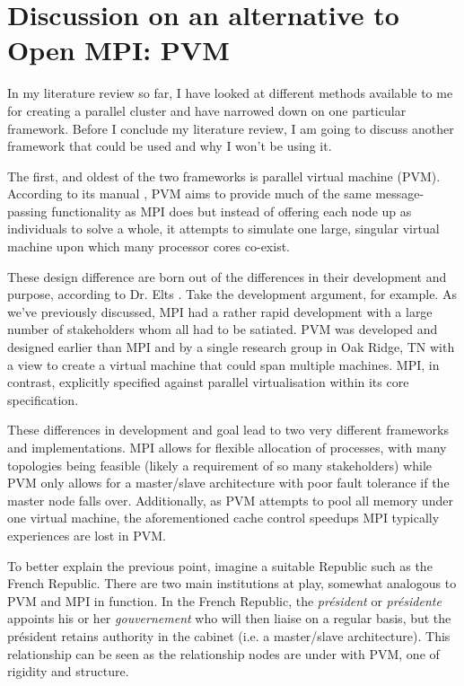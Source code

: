 \section{Discussion on an alternative to Open MPI: PVM}
In my literature review so far, I have looked at different methods available to me for creating a parallel cluster and have narrowed down on one particular framework. Before I conclude my literature review, I am going to discuss another framework that could be used and why I won't be using it.

The first, and oldest of the two frameworks is parallel virtual machine (PVM). According to its manual \cite{geist_et_al_1995}, PVM aims to provide much of the same message-passing functionality as MPI does but instead of offering each node up as individuals to solve a whole, it attempts to simulate one large, singular virtual machine upon which many processor cores co-exist.

These design difference are born out of the differences in their development and purpose, according to Dr. Elts \cite{elts_2004}. Take the development argument, for example. As we've previously discussed, MPI had a rather rapid development with a large number of stakeholders whom all had to be satiated. PVM was developed and designed earlier than MPI and by a single research group in Oak Ridge, TN with a view to create a virtual machine that could span multiple machines. MPI, in contrast, explicitly specified against parallel virtualisation within its core specification.

These differences in development and goal lead to two very different frameworks and implementations. MPI allows for flexible allocation of processes, with many topologies being feasible (likely a requirement of so many stakeholders) while PVM only allows for a master/slave architecture with poor fault tolerance if the master node falls over. Additionally, as PVM attempts to pool all memory under one virtual machine, the aforementioned cache control speedups MPI typically experiences are lost in PVM.
\vfill\break

To better explain the previous point, imagine a suitable Republic such as the French Republic. There are two main institutions at play, somewhat analogous to PVM and MPI in function. In the French Republic, the \emph{président} or \emph{présidente} appoints his or her \emph{gouvernement} who will then liaise on a regular basis, but the président retains authority in the cabinet (i.e. a master/slave architecture). This relationship can be seen as the relationship nodes are under with PVM, one of rigidity and structure.

